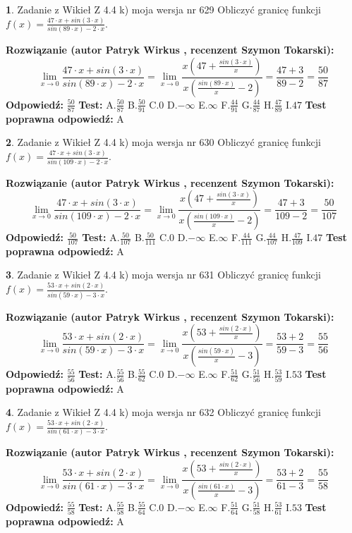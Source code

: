 \documentclass[12pt, a4paper]{article}
\theoremstyle{definition} %
\newtheorem{zad}{}
\newcommand{\zadStart}[1]{\begin{zad}#1\newline}
\newcommand{\zadStop}{\end{zad}}
\newcommand{\rozwStart}[2]{\noindent \textbf{Rozwiązanie (autor #1 , recenzent #2): }\newline}
\newcommand{\rozwStop}{\newline}
\newcommand{\odpStart}{\noindent \textbf{Odpowiedź:}\newline}
\newcommand{\odpStop}{\newline}
\newcommand{\testStart}{\noindent \textbf{Test:}\newline}
\newcommand{\testStop}{\newline}
\newcommand{\kluczStart}{\noindent \textbf{Test poprawna odpowiedź:}\newline}
\newcommand{\kluczStop}{\newline}
\begin{document}
\zadStart{Zadanie z Wikieł Z 4.4 k) moja wersja nr 629}
Obliczyć granicę funkcji $f(x)=\frac{47\cdot x +sin(3\cdot x)}{sin(89\cdot x) -2\cdot x}$.
\zadStop
\rozwStart{Patryk Wirkus}{Szymon Tokarski}
$$\lim\limits_{x\to 0}\frac{47\cdot x +sin(3\cdot x)}{sin(89\cdot x) -2\cdot x}
=\lim\limits_{x\to 0}\frac{x(47+\frac{sin(3\cdot x)}{x})}{x(\frac{sin(89\cdot x)}{x}-2)}
=\frac{47+3}{89-2} = \frac{50}{87}$$
\rozwStop
\odpStart
$\frac{50}{87}$
\odpStop
\testStart
A.$\frac{50}{87}$
B.$\frac{50}{91}$
C.$0$
D.$-\infty$
E.$\infty$
F.$\frac{44}{91}$
G.$\frac{44}{87}$
H.$\frac{47}{89}$
I.$47$
\testStop
\kluczStart
A
\kluczStop



\zadStart{Zadanie z Wikieł Z 4.4 k) moja wersja nr 630}
Obliczyć granicę funkcji $f(x)=\frac{47\cdot x +sin(3\cdot x)}{sin(109\cdot x) -2\cdot x}$.
\zadStop
\rozwStart{Patryk Wirkus}{Szymon Tokarski}
$$\lim\limits_{x\to 0}\frac{47\cdot x +sin(3\cdot x)}{sin(109\cdot x) -2\cdot x}
=\lim\limits_{x\to 0}\frac{x(47+\frac{sin(3\cdot x)}{x})}{x(\frac{sin(109\cdot x)}{x}-2)}
=\frac{47+3}{109-2} = \frac{50}{107}$$
\rozwStop
\odpStart
$\frac{50}{107}$
\odpStop
\testStart
A.$\frac{50}{107}$
B.$\frac{50}{111}$
C.$0$
D.$-\infty$
E.$\infty$
F.$\frac{44}{111}$
G.$\frac{44}{107}$
H.$\frac{47}{109}$
I.$47$
\testStop
\kluczStart
A
\kluczStop



\zadStart{Zadanie z Wikieł Z 4.4 k) moja wersja nr 631}
Obliczyć granicę funkcji $f(x)=\frac{53\cdot x +sin(2\cdot x)}{sin(59\cdot x) -3\cdot x}$.
\zadStop
\rozwStart{Patryk Wirkus}{Szymon Tokarski}
$$\lim\limits_{x\to 0}\frac{53\cdot x +sin(2\cdot x)}{sin(59\cdot x) -3\cdot x}
=\lim\limits_{x\to 0}\frac{x(53+\frac{sin(2\cdot x)}{x})}{x(\frac{sin(59\cdot x)}{x}-3)}
=\frac{53+2}{59-3} = \frac{55}{56}$$
\rozwStop
\odpStart
$\frac{55}{56}$
\odpStop
\testStart
A.$\frac{55}{56}$
B.$\frac{55}{62}$
C.$0$
D.$-\infty$
E.$\infty$
F.$\frac{51}{62}$
G.$\frac{51}{56}$
H.$\frac{53}{59}$
I.$53$
\testStop
\kluczStart
A
\kluczStop



\zadStart{Zadanie z Wikieł Z 4.4 k) moja wersja nr 632}
Obliczyć granicę funkcji $f(x)=\frac{53\cdot x +sin(2\cdot x)}{sin(61\cdot x) -3\cdot x}$.
\zadStop
\rozwStart{Patryk Wirkus}{Szymon Tokarski}
$$\lim\limits_{x\to 0}\frac{53\cdot x +sin(2\cdot x)}{sin(61\cdot x) -3\cdot x}
=\lim\limits_{x\to 0}\frac{x(53+\frac{sin(2\cdot x)}{x})}{x(\frac{sin(61\cdot x)}{x}-3)}
=\frac{53+2}{61-3} = \frac{55}{58}$$
\rozwStop
\odpStart
$\frac{55}{58}$
\odpStop
\testStart
A.$\frac{55}{58}$
B.$\frac{55}{64}$
C.$0$
D.$-\infty$
E.$\infty$
F.$\frac{51}{64}$
G.$\frac{51}{58}$
H.$\frac{53}{61}$
I.$53$
\testStop
\kluczStart
A
\kluczStop
\end{document}
